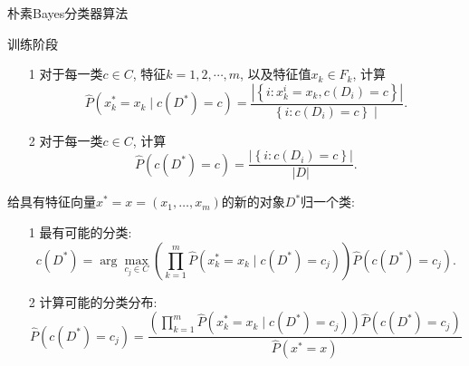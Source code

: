 \begin{algorithm}
    \caption{朴素Bayes分类器算法}
    \label{algo:Bayes-class}

    训练阶段
    \begin{itemize}
        \item [1] 对于每一类$c\in C$, 特征$k=1,2,\cdots, m$, 以及特征值$x_k\in F_k$, 计算$$
        \hat{P}\left(x_k^*=x_k \mid c\left(D^*\right)=c\right)=\frac{\left|\left\{i: x_k^i=x_k, c\left(D_i\right)=c\right\}\right|}{\left\{i : c\left(D_i\right)=c\right\} \mid} .
        $$
        \item [2] 对于每一类$c\in C$, 计算$$
        \hat{P}\left(c\left(D^*\right)=c\right)=\frac{\left|\left\{i : c\left(D_i\right)=c\right\}\right|}{|D|} .
        $$
    \end{itemize}

    给具有特征向量$x^*=x=\left(x_1, \ldots, x_m\right)$的新的对象$D^*$归一个类: 
    \begin{itemize}
        \item [1] 最有可能的分类: $$c\left(D^*\right)=\arg \max _{c_j \in C}\left(\prod_{k=1}^m \hat{P}\left(x_k^*=x_k \mid c\left(D^*\right)=c_j\right)\right) \hat{P}\left(c\left(D^*\right)=c_j\right) .$$
        \item [2] 计算可能的分类分布:$$\hat{P}\left(c\left(D^*\right)=c_j\right)=\frac{\left(\prod_{k=1}^m \hat{P}\left(x_k^*=x_k \mid c\left(D^*\right)=c_j\right)\right) \hat{P}\left(c\left(D^*\right)=c_j\right)}{\hat{P}\left(x^*=x\right)}$$
    \end{itemize}
\end{algorithm}
